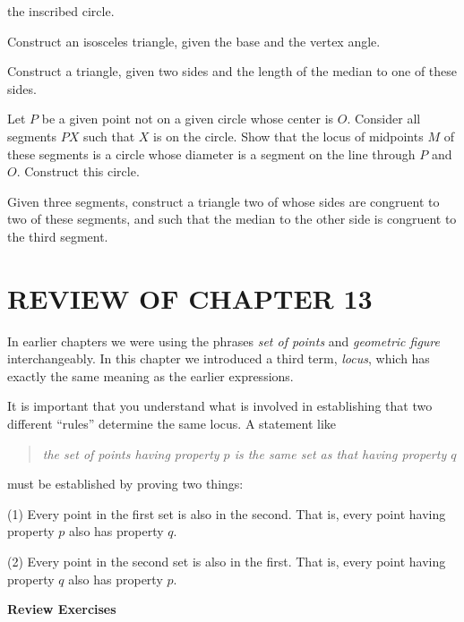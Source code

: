 \documentclass[11pt]{book}
\begin{document}
\begin{exercisecols}
\begin{exlist}
      the inscribed circle.
\item[17.] Construct an isosceles triangle, given the base and the vertex angle.
\item[18.] Construct a triangle, given two sides and the length of the median to
      one of these sides.
\item[\stex 19.] Let $P$ be a given point not on a given circle whose center is
      $O$. Consider all segments $PX$ such that $X$ is on the circle. Show that
      the locus of midpoints $M$ of these segments is a circle whose diameter is
      a segment on the line through $P$ and $O$. Construct this circle.
\item[\stex 20.] Given three segments, construct a triangle two of whose sides
      are congruent to two of these segments, and such that the median to the
      other side is congruent to the third segment.
\end{exlist}
\end{exercisecols}

\section*{REVIEW OF CHAPTER 13}

In earlier chapters we were using the phrases \emph{set of points} and
\emph{geometric figure} interchangeably. In this chapter we introduced a third
term, \emph{locus}, which has exactly the same meaning as the earlier
expressions.

It is important that you understand what is involved in establishing that two
different ``rules'' determine the same locus. A statement like

\begin{quote}
\emph{the set of points having property $p$ is the same set as that having
property $q$}
\end{quote}

\noindent must be established by proving two things:

(1) Every point in the first set is also in the second. That is, every point
having property $p$ also has property $q$.

(2) Every point in the second set is also in the first. That is, every point
having property $q$ also has property $p$.

\par\medskip\begin{center}\bfseries Review Exercises\end{center}\par\nopagebreak
\end{document}
